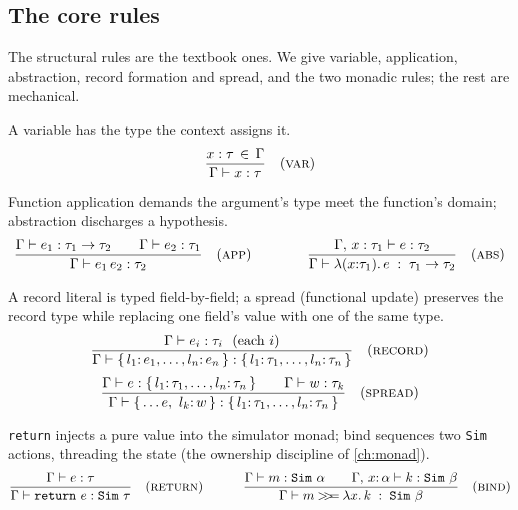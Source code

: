 \subsection{The core rules}
\label{sec:b-coretyping}

The structural rules are the textbook ones. We give variable, application,
abstraction, record formation and spread, and the two monadic rules; the rest are
mechanical.

\begin{description}[leftmargin=1.4em, style=nextline]
\item[Variable.] A variable has the type the context assigns it.
\[
  \dfrac{x : \tau \,\in\, \Gamma}{\Gamma \vdash x : \tau}\quad(\textsc{var})
\]

\item[Application and abstraction.] Function application demands the argument's
type meet the function's domain; abstraction discharges a hypothesis.
\[
  \dfrac{\Gamma \vdash e_1 : \tau_1 \to \tau_2 \qquad \Gamma \vdash e_2 : \tau_1}
        {\Gamma \vdash e_1\,e_2 : \tau_2}\quad(\textsc{app})
  \qquad\qquad
  \dfrac{\Gamma,\, x : \tau_1 \vdash e : \tau_2}
        {\Gamma \vdash \lambda(x{:}\tau_1).\,e \;:\; \tau_1 \to \tau_2}\quad(\textsc{abs})
\]

\item[Records and spread.] A record literal is typed field-by-field; a spread
(functional update) preserves the record type while replacing one field's value
with one of the same type.
\[
  \dfrac{\Gamma \vdash e_i : \tau_i \ \ (\text{each } i)}
        {\Gamma \vdash \{\, l_1{:}\,e_1,\dots,l_n{:}\,e_n \,\} : \{\, l_1{:}\,\tau_1,\dots,l_n{:}\,\tau_n \,\}}
  \quad(\textsc{record})
\]
\[
  \dfrac{\Gamma \vdash e : \{\, l_1{:}\,\tau_1,\dots,l_n{:}\,\tau_n \,\}
         \qquad \Gamma \vdash w : \tau_k}
        {\Gamma \vdash \{\, \dots e,\ l_k{:}\,w \,\} : \{\, l_1{:}\,\tau_1,\dots,l_n{:}\,\tau_n \,\}}
  \quad(\textsc{spread})
\]

\item[Monad: return and bind.] \lstinline[style=l4style]|return| injects a pure
value into the simulator monad; bind sequences two \lstinline[style=l4style]|Sim|
actions, threading the state (the ownership discipline of \cref{ch:monad}).
\[
  \dfrac{\Gamma \vdash e : \tau}{\Gamma \vdash \texttt{return}\ e : \texttt{Sim}\ \tau}
  \quad(\textsc{return})
  \qquad\quad
  \dfrac{\Gamma \vdash m : \texttt{Sim}\ \alpha \qquad \Gamma,\, x{:}\,\alpha \vdash k : \texttt{Sim}\ \beta}
        {\Gamma \vdash m \mathbin{>\!\!>\!\!=} \lambda x.\,k \;:\; \texttt{Sim}\ \beta}
  \quad(\textsc{bind})
\]
\end{description}

